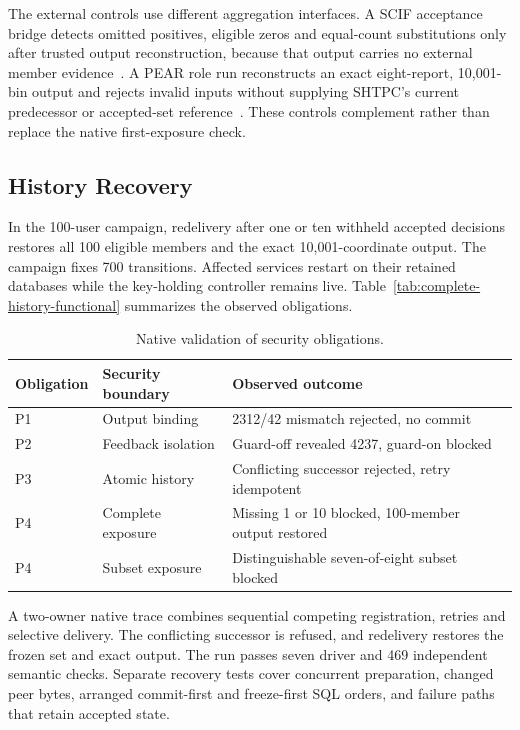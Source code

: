 \documentclass[conference,compsoc]{IEEEtran}
\theoremstyle{definition}
\numberwithin{equation}{section}
\numberwithin{table}{section}
\numberwithin{figure}{section}
\theoremstyle{plain}
\begin{document}
\label{sec:strong-baselines}
The external controls use different aggregation interfaces. A SCIF
acceptance bridge detects omitted positives, eligible zeros and equal-count
substitutions only after trusted output reconstruction, because that output
carries no external member evidence~\cite{Su2025SCIF}. A PEAR role run
reconstructs an exact eight-report, 10,001-bin output and rejects invalid
inputs without supplying SHTPC's current predecessor or accepted-set
reference~\cite{Acharya2025PEAR}. These controls complement rather than
replace the native first-exposure check.

\subsection{History Recovery}
\label{sec:eval-failure-cuts}

In the 100-user campaign, redelivery after one or ten withheld accepted
decisions restores all 100 eligible members and the exact 10,001-coordinate
output. The campaign fixes 700 transitions. Affected services restart on their
retained databases while the key-holding controller remains live.
Table~\ref{tab:complete-history-functional} summarizes the observed obligations.

\begin{table}[t]
\centering
\caption{Native validation of security obligations.}
\label{tab:complete-history-functional}
\label{tab:failure-cuts}
\footnotesize
\begin{tabularx}{\columnwidth}{@{}lYY@{}}
\toprule
Obligation & Security boundary & Observed outcome \\
\midrule
P1 & Output binding & 2312/42 mismatch rejected, no commit \\
P2 & Feedback isolation & Guard-off revealed 4237, guard-on blocked \\
P3 & Atomic history & Conflicting successor rejected, retry idempotent \\
P4 & Complete exposure & Missing 1 or 10 blocked, 100-member output restored \\
P4 & Subset exposure & Distinguishable seven-of-eight subset blocked \\
\bottomrule
\end{tabularx}
\end{table}

A two-owner native trace combines sequential competing registration, retries
and selective delivery. The conflicting successor is refused, and redelivery
restores the frozen set and exact output. The run passes seven driver and 469
independent semantic checks. Separate recovery tests cover concurrent
preparation, changed peer bytes, arranged commit-first and freeze-first SQL
orders, and failure paths that retain accepted state.
\end{document}
